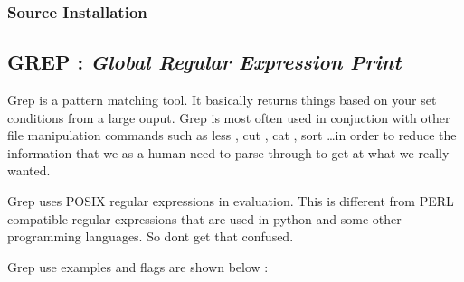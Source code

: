 \subsubsectionend

\subsubsection{Source Installation}
\label{sssec:source_installation}



\subsubsectionend

\subsectionend

\subsection{GREP : \textit{Global Regular Expression Print} }
\label{ssec:grep}

\noindent
Grep is a pattern matching tool. It basically returns things based on your set
conditions from a large ouput.  Grep is most often used in conjuction with other
file manipulation commands such as less , cut , cat , sort \ldots in order to
reduce the information that we as a human need to parse through to get at what
we really wanted.

Grep uses POSIX regular expressions in evaluation. This is different from PERL
compatible regular expressions that are used in python and some other
programming languages. So dont get that confused.

Grep use examples and flags are shown below :


